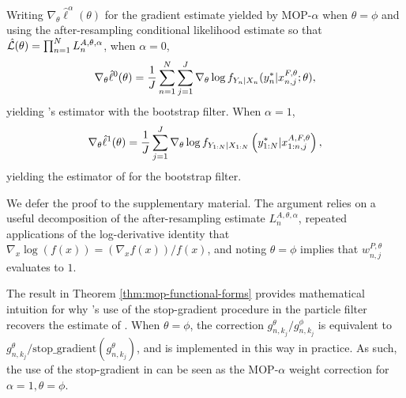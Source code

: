 \documentclass[numsec,webpdf,modern,medium,namedate]{oup-authoring-template}
\newcommand\arxiv[2]{#2} %
\theoremstyle{thmstyleone}%
\theoremstyle{thmstyletwo}%
\theoremstyle{thmstylethree}%
\begin{document}
\begin{thm}
    \label{thm:mop-functional-forms}
    Writing $\nabla_\theta \hat\ell^\alpha(\theta)$ for the gradient estimate yielded by MOP-$\alpha$ when $\theta=\phi$ and using the after-resampling conditional likelihood estimate so that $\hat{\mathcal{L}}(\theta) = \prod_{n=1}^N L_n^{A, \theta, \alpha}$, when $\alpha=0$,
    \vspace*{-3ex}
    \begin{equation} \nonumber
        \nabla_\theta \hat\ell^0(\theta) 
        = \frac{1}{J} \sum_{n=1}^N \sum_{j=1}^J \nabla_\theta \log f_{Y_n|X_{n}}(y_n^*|x_{n,j}^{F, \theta}; \theta),
        \vspace*{-3ex}
    \end{equation}
    yielding \cite{naesseth18}'s estimator with the bootstrap filter. When $\alpha=1$,
    \vspace*{-3ex}
    \begin{equation} \nonumber
        \nabla_\theta \hat{\ell}^1(\theta) 
        = \frac{1}{J}\sum_{j=1}^J \nabla_\theta \log f_{Y_{1:N}|X_{1:N}}\left(y_{1:N}^* | x_{1:n,j}^{A, F,\theta}\right),
    \vspace*{-3ex}
    \end{equation}
    yielding the estimator of \cite{poyiadjis11} for the bootstrap filter.
\end{thm}

We defer the proof to \arxiv{Appendix~\ref{appendix:functional}}{the supplementary material}. 
The argument relies on a useful decomposition of the after-resampling estimate $L_n^{A,\theta,\alpha}$, repeated applications of the log-derivative identity that $\nabla_x \log(f(x)) = (\nabla_x f(x))/f(x)$, and noting $\theta=\phi$ implies that $w_{n,j}^{P,\theta}$ evaluates to $1$. 

The result in Theorem \ref{thm:mop-functional-forms} provides mathematical intuition for why \cite{scibior21}'s use of the stop-gradient procedure in the particle filter recovers the estimate of \cite{poyiadjis11}. When $\theta=\phi$, the correction $g_{n,k_j}^\theta/g_{n,k_j}^\phi$ is equivalent to $g_{n,k_j}^\theta / \text{stop\_gradient}(g_{n,k_j}^\theta)$, and is implemented in this way in practice. As such, the use of the stop-gradient in \cite{scibior21} can be seen as the MOP-$\alpha$ weight correction for $\alpha=1, \theta=\phi$.

\end{document}
